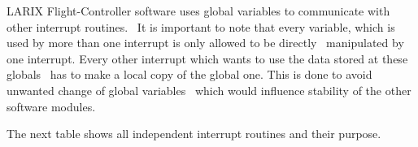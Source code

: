 L\+A\+R\+IX Flight-\/\+Controller software uses global variables to communicate with other interrupt routines.~\newline
 It is important to note that every variable, which is used by more than one interrupt is only allowed to be directly~\newline
 manipulated by one interrupt. Every other interrupt which wants to use the data stored at these globals~\newline
 has to make a local copy of the global one. This is done to avoid unwanted change of global variables~\newline
 which would influence stability of the other software modules.

The next table shows all independent interrupt routines and their purpose. ~\newline


